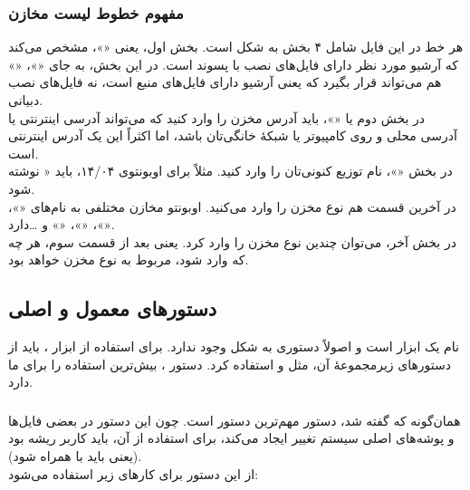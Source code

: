 \subsubsection{مفهوم خطوط لیست مخازن}
هر خط در این فایل شامل ۴ بخش به شکل  است. بخش اول، یعنی «»، مشخص می‌کند که آرشیو مورد نظر دارای فایل‌های نصب با پسوند  است. در این بخش، به جای «»، «» هم می‌تواند قرار بگیرد که یعنی آرشیو دارای فایل‌های منبع است، نه فایل‌های نصب دبیانی.\\
در بخش دوم یا «»، باید آدرس مخزن را وارد کنید که می‌تواند آدرسی اینترنتی یا آدرسی محلی و روی کامپیوتر یا شبکهٔ خانگی‌تان باشد، اما اکثراً این یک آدرس اینترنتی است.\\
در بخش «»، نام توزیع کنونی‌تان را وارد کنید. مثلاً برای اوبونتوی ۱۴/۰۴، باید « نوشته شود.\\
در آخرین قسمت هم نوع مخزن را وارد می‌کنید. اوبونتو مخازن مختلفی به نام‌های «»، «»، «»، «» و \ldots دارد.\\
در بخش آخر، می‌توان چندین نوع مخزن را وارد کرد. یعنی بعد از قسمت سوم، هر چه که وارد شود، مربوط به نوع مخزن خواهد بود.

\subsection[دستورهای معمول و اصلی Apt]{دستورهای معمول و اصلی }
 نام یک ابزار است و اصولاً دستوری به شکل  وجود ندارد. برای استفاده از ابزار ، باید از دستورهای زیرمجموعهٔ آن، مثل  و  استفاده کرد. دستور ، بیش‌ترین استفاده را برای ما دارد.

\subsubsection[apt-get]{}
همان‌گونه که گفته شد، دستور  مهم‌ترین دستور است. چون این دستور در بعضی فایل‌ها و پوشه‌های اصلی سیستم تغییر ایجاد می‌کند، برای استفاده از آن، باید کاربر ریشه بود (یعنی باید با  همراه شود).\\
از این دستور برای کارهای زیر استفاده می‌شود:


